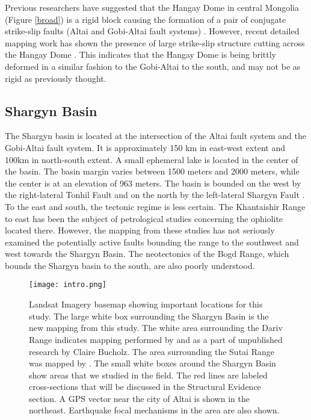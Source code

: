 	Previous researchers have suggested that the Hangay Dome in central Mongolia (Figure \ref{broad}) is a rigid block causing the formation of a pair of conjugate strike-slip faults (Altai and Gobi-Altai fault systems) \citep{Cunningham2005a}. However, recent detailed mapping work has shown the presence of large strike-slip structure cutting across the Hangay Dome \citep{Walker2007}. This indicates that the Hangay Dome is being brittly deformed in a similar fashion to the Gobi-Altai to the south, and may not be as rigid as previously thought\citep{Walker2006}\citep{Walker2007}\citep{Walker2008}.

\subsection{Shargyn Basin}

	The Shargyn basin is located at the intersection of the Altai fault system and the Gobi-Altai fault system. It is approximately 150 km in east-west extent and 100km in north-south extent. A small ephemeral lake is located in the center of the basin. The basin margin varies between 1500 meters and 2000 meters, while the center is at an elevation of 963 meters. The basin is bounded on the west by the right-lateral Tonhil Fault and on the north by the left-lateral Shargyn Fault \citep{Cunningham2003}. To the east and south, the tectonic regime is less certain. The Khantaishir Range to east has been the subject of petrological studies concerning the ophiolite located there. However, the mapping from these studies has not seriously examined the potentially active faults bounding the range to the southwest and west towards the Shargyn Basin.  The neotectonics of the Bogd Range, which bounds the Shargyn basin to the south, are also poorly understood.

\begin{figure}[h!]
	\centering
	\texttt{[image: intro.png]}
	\caption{Landsat Imagery basemap showing important locations for this study. The large white box surrounding the Shargyn Basin is the new mapping from this study. The white area surrounding the Dariv Range indicates mapping performed by \citet{Dijkstra2006} and as a part of unpublished research by Claire Bucholz. The area surrounding the Sutai Range was mapped by \citet{Cunningham2003}. The small white boxes around the Shargyn Basin show areas that we studied in the field. The red lines are labeled cross-sections that will be discussed in the Structural Evidence section. A GPS vector near the city of Altai is shown in the northeast. Earthquake focal mechanisms in the area are also shown.}
	\label{intro}
\end{figure}
	
